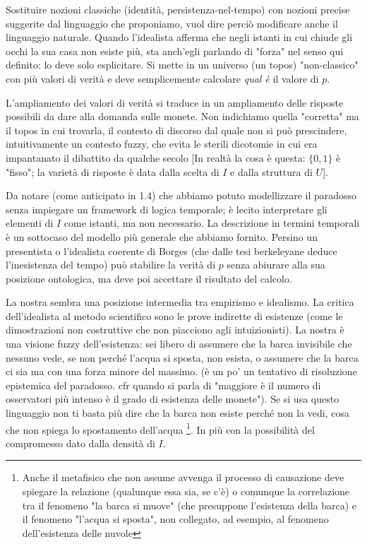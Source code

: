 Sostituire nozioni classiche (identità, persistenza-nel-tempo) con nozioni precise suggerite dal linguaggio che proponiamo, vuol dire perciò modificare anche il linguaggio naturale. Quando l'idealista afferma che negli istanti in cui chiude gli occhi la sua casa non esiste più, sta anch'egli parlando di "forza" nel senso qui definito: lo deve solo esplicitare. Si mette in un universo (un topos) "non-classico" con più valori di verità e deve semplicemente calcolare \emph{qual è} il valore di $p$. 

L'ampliamento dei valori di verità si traduce in un ampliamento delle risposte possibili da dare alla domanda sulle monete. Non indichiamo quella "corretta" ma il topos in cui trovarla, il contesto di discorso dal quale non si può prescindere, intuitivamente un contesto fuzzy, che evita le sterili dicotomie in cui era impantanato il dibattito da qualche secolo [In realtà la cosa è questa: $\{0,1\}$ è "fisso"; la varietà di risposte è data dalla scelta di $I$ e dalla struttura di $U$].

Da notare (come anticipato in 1.4) che abbiamo potuto modellizzare il paradosso senza impiegare un framework di logica temporale; è lecito interpretare gli elementi di $I$ come istanti, ma non necessario. La descrizione in termini temporali è un sottocaso del modello più generale che abbiamo fornito. Persino un presentista o l'idealista coerente di Borges (che dalle tesi berkeleyane deduce l'inesistenza del tempo) può stabilire la verità di $p$ senza abiurare alla sua posizione ontologica, ma deve poi accettare il risultato del calcolo. 


La nostra sembra una posizione intermedia tra empirismo e idealismo. La critica dell'idealista al metodo scientifico sono le prove indirette di esistenze (come le dimostrazioni non costruttive che non piacciono agli intuizionisti). La nostra è una visione fuzzy dell'esistenza: sei libero di assumere che la barca invisibile che nessuno vede, se non perché l'acqua si sposta, non esista, o assumere che la barca ci sia ma con una forza minore del massimo. (è un po' un tentativo di risoluzione epistemica del paradosso. cfr quando si parla di "maggiore è il numero di osservatori più intenso è il grado di esistenza delle monete"). Se si usa questo linguaggio non ti basta più dire che la barca non esiste perché non la vedi, cosa che non spiega lo spostamento dell'acqua \footnote{Anche il metafisico che non assume avvenga il processo di causazione deve spiegare la relazione (qualunque essa sia, se c'è) o comunque la correlazione tra il fenomeno "la barca si muove" (che presuppone l'esistenza della barca) e il fenomeno "l'acqua si sposta", non collegato, ad esempio, al fenomeno dell'esistenza delle nuvole}. In più con la possibilità del compromesso dato dalla densità di $I$.

